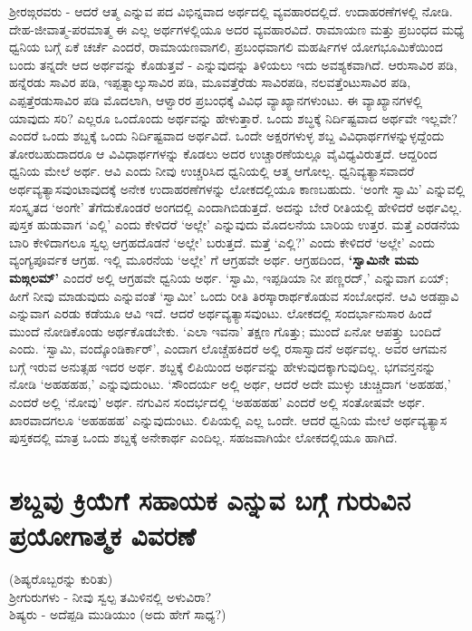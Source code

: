 ಶ್ರೀರಙ್ಗರವರು - ಆದರೆ ಆತ್ಮ ಎನ್ನುವ ಪದ ವಿಭಿನ್ನವಾದ ಅರ್ಥದಲ್ಲಿ ವ್ಯವಹಾರದಲ್ಲಿದೆ. ಉದಾಹರಣೆಗಳಲ್ಲಿ ನೋಡಿ. ದೇಹ-ಜೀವಾತ್ಮ-ಪರಮಾತ್ಮ ಈ ಎಲ್ಲ ಅರ್ಥಗಳಲ್ಲಿಯೂ ಅದರ ವ್ಯವಹಾರವಿದೆ. ರಾಮಾಯಣ ಮತ್ತು ಪ್ರಬಂಧದ ಮಧ್ಯೆ ಧ್ವನಿಯ ಬಗ್ಗೆ ಏಕೆ ಚರ್ಚೆ ಎಂದರೆ, ರಾಮಾಯಣವಾಗಲಿ, ಪ್ರಬಂಧವಾಗಲಿ ಮಹರ್ಷಿಗಳ ಯೋಗಭೂಮಿಕೆಯಿಂದ ಬಂದು ತನ್ನದೇ ಆದ ಅರ್ಥವನ್ನು ಕೊಡುತ್ತವೆ - ಎನ್ನುವುದನ್ನು ತಿಳಿಯಲು ಇದು ಅವಶ್ಯಕವಾಗಿದೆ. ಆರುಸಾವಿರ ಪಡಿ, ಹನ್ನೆರಡು ಸಾವಿರ ಪಡಿ, ಇಪ್ಪತ್ನಾಲ್ಕುಸಾವಿರ ಪಡಿ, ಮೂವತ್ತೆರೆಡು ಸಾವಿರಪಡಿ, ನಲವತ್ತೆಂಟುಸಾವಿರ ಪಡಿ, ಎಪ್ಪತ್ತೆರಡುಸಾವಿರ ಪಡಿ ಮೊದಲಾಗಿ, ಆಳ್ವಾರರ ಪ್ರಬಂಧಕ್ಕೆ ವಿವಿಧ ವ್ಯಾಖ್ಯಾನಗಳುಂಟು. ಈ ವ್ಯಾಖ್ಯಾನಗಳಲ್ಲಿ ಯಾವುದು ಸರಿ? ಎಲ್ಲರೂ ಒಂದೊಂದು ಅರ್ಥವನ್ನು ಹೇಳುತ್ತಾರೆ. ಒಂದು ಶಬ್ಧಕ್ಕೆ ನಿರ್ದಿಷ್ಟವಾದ ಅರ್ಥವೇ ಇಲ್ಲವೇ? ಎಂದರೆ ಒಂದು ಶಬ್ದಕ್ಕೆ ಒಂದು ನಿರ್ದಿಷ್ಟವಾದ ಅರ್ಥವಿದೆ. ಒಂದೇ ಅಕ್ಷರಗಳುಳ್ಳ ಶಬ್ದ ವಿವಿಧಾರ್ಥಗಳನ್ನುಳ್ಳದ್ದೆಂದು ತೋರಬಹುದಾದರೂ ಆ ವಿವಿಧಾರ್ಥಗಳನ್ನು ಕೊಡಲು ಅದರ ಉಚ್ಚಾರಣೆಯಲ್ಲೂ ವೈವಿಧ್ಯವಿರುತ್ತದೆ. ಆದ್ದರಿಂದ ಧ್ವನಿಯ ಮೇಲೆ ಅರ್ಥ. ಆವಿ ಎಂದು ನೀವು ಉಚ್ಚರಿಸಿದ ಧ್ವನಿಯಲ್ಲಿ ಆತ್ಮ ಆಗೋಲ್ಲ. ಧ್ವನಿವ್ಯತ್ಯಾಸವಾದರೆ ಅರ್ಥವ್ಯತ್ಯಾಸವುಂಟಾವುದಕ್ಕೆ ಅನೇಕ ಉದಾಹರಣೆಗಳನ್ನು ಲೋಕದಲ್ಲಿಯೂ ಕಾಣಬಹುದು. `ಅಂಗೇ ಸ್ವಾಮಿ' ಎನ್ನುವಲ್ಲಿ ಸಂಸ್ಕೃತದ `ಅಂಗೇ' ತೆಗೆದುಕೊಂಡರೆ ಅಂಗದಲ್ಲಿ ಎಂದಾಗಿಬಿಡುತ್ತದೆ. ಅದನ್ನು ಬೇರೆ ರೀತಿಯಲ್ಲಿ ಹೇಳಿದರೆ ಅರ್ಥವಿಲ್ಲ. ಪುಸ್ತಕ ಹುಡುವಾಗ `ಎಲ್ಲಿ' ಎಂದು ಕೇಳಿದರೆ `ಅಲ್ಲೇ' ಎನ್ನುವುದು ಮೊದಲನೆಯ ಬಾರಿಯ ಉತ್ತರ. ಮತ್ತೆ ಎರಡನೆಯ ಬಾರಿ ಕೇಳಿದಾಗಲೂ ಸ್ವಲ್ಪ ಆಗ್ರಹದೊಡನೆ `ಅಲ್ಲೇ' ಬರುತ್ತದೆ. ಮತ್ತೆ `ಎಲ್ಲಿ?' ಎಂದು ಕೇಳಿದರೆ `ಅಲ್ಲೇ' ಎಂದು ವ್ಯಂಗ್ಯಪೂರ್ವಕ ಆಗ್ರಹ. ಇಲ್ಲಿ ಮೂರನೆಯ `ಅಲ್ಲೇ' ಗೆ ಆಗ್ರಹವೇ ಅರ್ಥ. ಆಗ್ರಹದಿಂದ, {\bf `ಸ್ವಾಮಿನೇ ಮಮ ಮಙ್ಗಲಮ್'}\label{234} ಎಂದರೆ ಅಲ್ಲಿ ಆಗ್ರಹವೇ ಧ್ವನಿಯ ಅರ್ಥ. `ಸ್ವಾಮಿ, ಇಪ್ಪಡಿಯಾ ನೀ ಪಣ್ಣರದ್,' ಎನ್ನುವಾಗ ಏಯ್; ಹೀಗೆ ನೀವು ಮಾಡುವುದು ಎನ್ನುವಂತೆ `ಸ್ವಾಮೀ' ಒಂದು ರೀತಿ ತಿರಸ್ಕಾರಾರ್ಥಕೊಡುವ ಸಂಬೋಧನೆ. ಆವಿ ಅಡಪ್ಪಾವಿ ಎನ್ನುವಾಗ ಎರಡು ಕಡೆಯೂ ಆವಿ ಇದೆ. ಆದರೆ ಅರ್ಥವ್ಯತ್ಯಾಸವುಂಟು. ಲೋಕದಲ್ಲಿ ಸಂದರ್ಭಾನುಸಾರ ಹಿಂದೆ ಮುಂದೆ ನೋಡಿಕೊಂಡು ಅರ್ಥಕೊಡಬೇಕು. `ಎಲಾ ಇವನಾ' ತಕ್ಷಣ ಗೊತ್ತು; ಮುಂದೆ ಏನೋ ಆಪತ್ತ್ತು ಬಂದಿದೆ ಎಂದು. `ಸ್ವಾಮಿ, ವಂದ್ಕೊಂಡಿರ್ಕಾರ್', ಎಂದಾಗ ಲೊಚ್ಚೆಹಕಿದರೆ ಅಲ್ಲಿ ರಸಾಸ್ವಾದನೆ ಅರ್ಥವಲ್ಲ. ಅವರ ಆಗಮನ ಬಗ್ಗೆ ಇರುವ ಅನುತ್ಸಹ ಇದರ ಅರ್ಥ. ಶಬ್ದಕ್ಕೆ ಲಿಪಿಯಿಂದ ಅರ್ಥವನ್ನು ಹೇಳುವುದಕ್ಕಾಗುವುದಿಲ್ಲ. ಭಗವನ್ತನನ್ನು ನೋಡಿ `ಅಹಹಹಹ,' ಎನ್ನುವುದುಂಟು. `ಸೌಂದರ್ಯ ಅಲ್ಲಿ ಅರ್ಥ, ಆದರೆ ಅದೇ ಮುಳ್ಳು  ಚುಚ್ಚಿದಾಗ `ಅಹಹಹ,' ಎಂದರೆ ಅಲ್ಲಿ `ನೋವು' ಅರ್ಥ. ನಗುವಿನ ಸಂದರ್ಭದಲ್ಲಿ `ಅಹಹಹಹ' ಎಂದರೆ ಅಲ್ಲಿ ಸಂತೋಷವೇ ಅರ್ಥ. ಖಾರವಾದಗಲೂ `ಅಹಹಹಹ' ಎನ್ನುವುದುಂಟು. ಲಿಪಿಯಲ್ಲಿ ಎಲ್ಲ ಒಂದೇ. ಆದರೆ ಧ್ವನಿಯ ಮೇಲೆ ಅರ್ಥವ್ಯತ್ಯಾಸ ಪುಸ್ತಕದಲ್ಲಿ ಮಾತ್ರ ಒಂದು ಶಬ್ದಕ್ಕೆ ಅನೇಕಾರ್ಥ ಎಂದಿಲ್ಲ. ಸಹಜವಾಗಿಯೇ ಲೋಕದಲ್ಲಿಯೂ ಹಾಗಿದೆ. 

\section*{ಶಬ್ದವು ಕ್ರಿಯೆಗೆ ಸಹಾಯಕ ಎನ್ನುವ ಬಗ್ಗೆ ಗುರುವಿನ ಪ್ರಯೋಗಾತ್ಮಕ ವಿವರಣೆ}

(ಶಿಷ್ಯರೊಬ್ಬರನ್ನು ಕುರಿತು)\\
ಶ್ರೀಗುರುಗಳು - ನೀವು ಸ್ವಲ್ಪ ತಮಿಳಿನಲ್ಲಿ ಅಳುವಿರಾ?\\
ಶಿಷ್ಯರು - ಅದೆಪ್ಪಡಿ ಮುಡಿಯುಂ (ಅದು ಹೇಗೆ ಸಾಧ್ಯ?)\\

